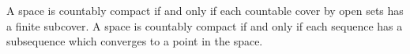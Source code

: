 A space is countably compact if and only if each countable cover by open sets has a finite subcover. A space is countably compact if and only if each sequence has a subsequence which converges to a point in the space.

